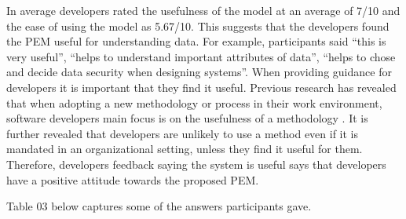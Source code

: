 \documentclass{sigchi}
\begin{document}
In average developers rated the usefulness of the model at an average of 7/10 and the ease of using the model as 5.67/10. This suggests that the developers found the PEM useful for understanding data. For example, participants said \enquote{this is very useful}, \enquote{helps to understand important attributes of data}, \enquote{helps to chose and decide data security when designing systems}. When providing guidance for developers it is important that they find it useful. Previous research has revealed that when adopting a new methodology or process in their work environment, software developers main focus is on the usefulness of a methodology \cite {hardgrave2003investigating}. It is further revealed that developers are unlikely to use a method even if it is mandated in an organizational setting, unless they find it useful for them. Therefore, developers feedback saying the system is useful says that developers have a positive attitude towards the proposed PEM.

Table 03 below captures some of the answers participants gave.
\end{document}
